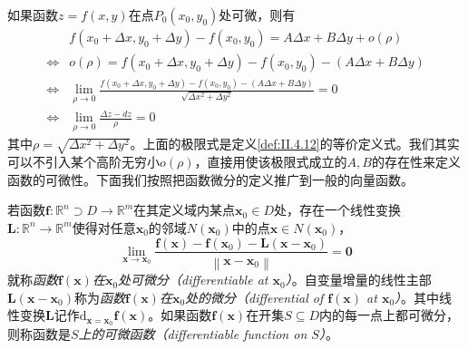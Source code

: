 \documentclass[main.tex]{subfiles}
\begin{document}
如果函数$z=f\left(x,y\right)$在点$P_0\left(x_0,y_0\right)$处可微，则有
\begin{align*}
                    & f\left(x_0+\Delta x,y_0+\Delta y\right)-f\left(x_0,y_0\right)=A\Delta x+B\Delta y+o\left(\rho\right)                                                 \\
    \Leftrightarrow & o\left(\rho\right)=f\left(x_0+\Delta x,y_0+\Delta y\right)-f\left(x_0,y_0\right)-\left(A\Delta x+B\Delta y\right)                                    \\
    \Leftrightarrow & \lim_{\rho\to0}\frac{f\left(x_0+\Delta x,y_0+\Delta y\right)-f\left(x_0,y_0\right)-\left(A\Delta x+B\Delta y\right)}{\sqrt{\Delta x^2+\Delta y^2}}=0 \\
    \Leftrightarrow & \lim_{\rho\to0}\frac{\Delta z-dz}{\rho}=0
\end{align*}
其中$\rho=\sqrt{\Delta x^2+\Delta y^2}$。上面的极限式是定义\ref{def:II.4.12}的等价定义式。我们其实可以不引入某个高阶无穷小$o\left(\rho\right)$，直接用使该极限式成立的$A,B$的存在性来定义函数的可微性。下面我们按照把函数微分的定义推广到一般的向量函数。

\begin{definition}[向量值函数的微分]\label{def:II.4.13}
    若函数$\mathbf{f}:\mathbb{R}^n\supset D\rightarrow\mathbb{R}^m$在其定义域内某点$\mathbf{x}_0\in D$处，存在一个线性变换$\mathbf{L}:\mathbb{R}^n\rightarrow\mathbb{R}^m$使得对任意$\mathbf{x}_0$的邻域$N\left(\mathbf{x}_0\right)$中的点$\mathbf{x}\in N\left(\mathbf{x}_0\right)$，
    \[\lim_{\mathbf{x}\rightarrow\mathbf{x}_0}\frac{\mathbf{f}\left(\mathbf{x}\right)-\mathbf{f}\left(\mathbf{x}_0\right)-\mathbf{L}\left(\mathbf{x}-\mathbf{x}_0\right)}{\left\|\mathbf{x}-\mathbf{x}_0\right\|}=\mathbf{0}\]
    就称\emph{函数$\mathbf{f}\left(\mathbf{x}\right)$在$\mathbf{x}_0$处可微分（differentiable at $\mathbf{x}_0$）}。自变量增量的线性主部$\mathbf{L}\left(\mathbf{x}-\mathbf{x}_0\right)$称为\emph{函数$\mathbf{f}\left(\mathbf{x}\right)$在$\mathbf{x}_0$处的微分（differential of $\mathbf{f}\left(\mathbf{x}\right)$ at $\mathbf{x}_0$）}。其中线性变换$\mathbf{L}$记作$\mathrm{d}_{\mathbf{x}=\mathbf{x}_0}\mathbf{f}\left(\mathbf{x}\right)$。如果函数$\mathbf{f}\left(\mathbf{x}\right)$在开集$S\subseteq D$内的每一点上都可微分，则称函数是\emph{$S$上的可微函数（differentiable function on $S$）}。
\end{definition}
\end{document}
